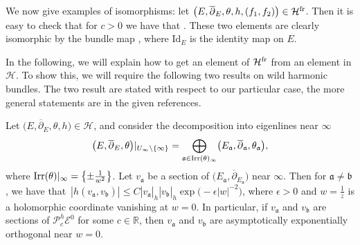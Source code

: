 \begin{Example} \label{exmorph} We now give examples of isomorphisms: let $\bigl(E,\overline{\partial}_E,\theta,h,(f_1,f_2)\bigr)\in \mathcal{H}^{{\rm fr}}$. Then it is easy to check that for $c>0$ we have that . These two elements are clearly isomorphic by the bundle map , where $\text{Id}_E$ is the identity map on $E$.
\end{Example}

In the following, we will explain how to get an element of $\mathcal{H}^{{\rm fr}}$ from an element in $\mathcal{H}$. To show this, we will require the following two results on wild harmonic bundles. The two result are stated with respect to our particular case, the more general statements are in the given references.

\begin{Theorem}\label{FT1} Let $\bigl(E,\overline{\partial}_E,\theta,h\bigr)\allowbreak\in \mathcal{H}$, and consider the decomposition into eigenlines near $\infty$
\begin{equation*}
\bigl(E,\overline{\partial}_E,\theta\bigr)|_{U_{\infty}\setminus \{\infty\}}=\bigoplus_{\mathfrak{a}\in \textnormal{Irr}(\theta)_{\infty}} \bigl(E_{\mathfrak{a}},\overline{\partial}_{\mathfrak{a}},\theta_{\mathfrak{a}}\bigr),
\end{equation*}
where $\textnormal{Irr}(\theta)|_{\infty}=\bigl\{\pm \frac{1}{w^2}\bigr\}$. Let $v_{\mathfrak{a}}$ be a section of $\bigl(E_{\mathfrak{a}},\overline{\partial}_{E_{\mathfrak{a}}}\bigr)$ near $\infty$. Then for $\mathfrak{a}\neq \mathfrak{b}$, we have that~${
 |h(v_{\mathfrak{a}},v_{\mathfrak{b}})|\leq C|v_{\mathfrak{a}}|_h|v_{\mathfrak{b}}|_h\exp \bigl(-\epsilon|w|^{-2}\bigr)}$,
where $\epsilon>0$ and $w=\frac{1}{z}$ is a holomorphic coordinate vanishing at $w=0$. In particular, if $v_{\mathfrak{a}}$ and $v_{\mathfrak{b}}$ are sections of $\mathcal{P}^h_c\mathcal{E}^0$ for some $c \in \mathbb{R}$, then $v_{\mathfrak{a}}$ and $v_{\mathfrak{b}}$ are asymptotically exponentially orthogonal near $w=0$.
\end{Theorem}

